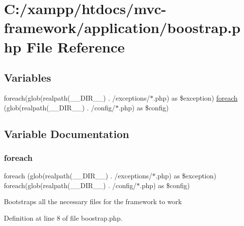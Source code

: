 \hypertarget{boostrap_8php}{}\section{C\+:/xampp/htdocs/mvc-\/framework/application/boostrap.php File Reference}
\label{boostrap_8php}
\subsection*{Variables}
\begin{DoxyCompactItemize}
\item 
foreach(glob(realpath(\+\_\+\+\_\+\+D\+I\+R\+\_\+\+\_\+) . \textquotesingle{}/exceptions/$\ast$.php\textquotesingle{}) as \$exception) \hyperlink{boostrap_8php_a43c3747e487b786ca7ccb692c4504c72}{foreach} (glob(realpath(\+\_\+\+\_\+\+D\+I\+R\+\_\+\+\_\+) . \textquotesingle{}/config/$\ast$.php\textquotesingle{}) as \$config)
\end{DoxyCompactItemize}


\subsection{Variable Documentation}
\hypertarget{boostrap_8php_a43c3747e487b786ca7ccb692c4504c72}{}\label{boostrap_8php_a43c3747e487b786ca7ccb692c4504c72} 
\subsubsection{\texorpdfstring{foreach}{foreach}}
{\footnotesize\ttfamily foreach (glob(realpath(\+\_\+\+\_\+\+D\+I\+R\+\_\+\+\_\+) . \textquotesingle{}/exceptions/$\ast$.php\textquotesingle{}) as \$exception) foreach(glob(realpath(\+\_\+\+\_\+\+D\+I\+R\+\_\+\+\_\+) . \textquotesingle{}/config/$\ast$.php\textquotesingle{}) as \$config)}

Bootstraps all the necessary files for the framework to work 

Definition at line 8 of file boostrap.\+php.

